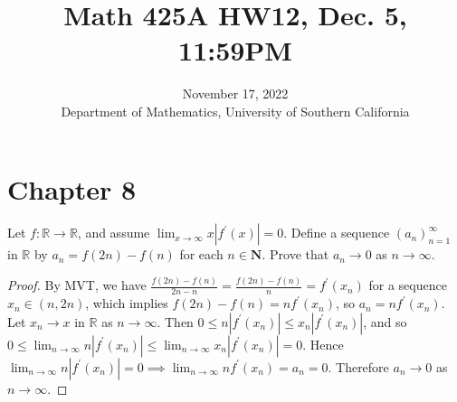\documentclass[oneside]{amsart}
\title{Math 425A HW12, Dec. 5, 11:59PM}
\date{November 17, 2022 \\ {Department of Mathematics, University of Southern California}}
\theoremstyle{definition}
\newcommand{\rr}{\mathbb R}
\newcommand{\nn}{\mathbf N}
\newcommand{\pp}{\prime}
\begin{document}
\maketitle
\setcounter{tocdepth}{4}
\setcounter{secnumdepth}{4}
 \section*{Chapter 8}
\begin{tcolorbox}[colback=black!5!white,colframe=black!75!black,title= Exercise $1.2.$]  Let $f \colon \rr \to \rr$, and assume $\lim _{x \to \infty} x |f^\pp (x)| = 0$. Define a sequence $(a_n)_{n=1}^\infty $ in $\rr$ by $a_n = f(2n)-f(n)$ for each $n \in \nn$. Prove that $a_n \to 0 $ as $n \to \infty$. 
\tcblower 
\begin{proof} By MVT, we have $\frac{f(2n)-f(n)}{2n-n} = \frac{f(2n)-f(n)}{n} = f^\prime (x_n)$ for a sequence $x_n \in (n,2n)$, which implies $ f(2n)-f(n)=nf^\pp (x_n)$, so $a_n = n f^\pp (x_n). $ Let $x_n \to x$ in $\rr$ as $n \to \infty$. Then $0 \leq n |f^\pp (x_n )| \leq x_n |f^\pp (x_n)|$, and so $ 0 \leq \lim_{n \to \infty} n |f^\pp (x_n)| \leq \lim_{n \to \infty} x_n |f^\pp (x_n)| = 0$. Hence $ \lim_{n \to \infty} n |f^\pp (x_n)| = 0 \implies \lim_{n \to \infty} n f^\prime (x_n) = a_n = 0$. Therefore $a_n \to 0$ as $n \to \infty$.
\end{proof}
\end{tcolorbox}
\end{document}
